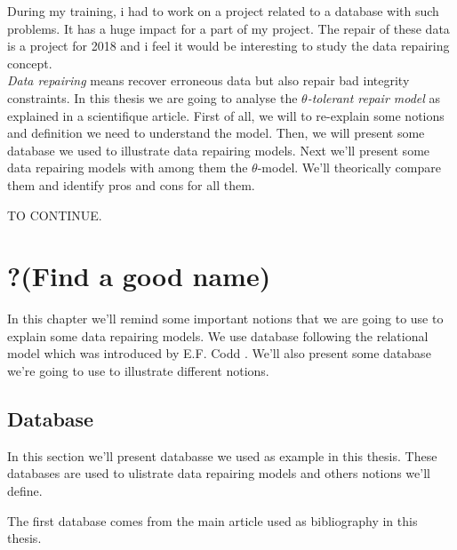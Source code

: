 \documentclass[letterpaper, 12pt]{report}
\newcommand{\alinea}{
\hspace*{0.5cm}}
\begin{document}
During my training, i had to work on a project related to a database with such problems. It has a huge impact for a part of my project. The repair of these data is a project for 2018 and i feel it would be interesting to study the data repairing concept.\\

\emph{Data repairing} means recover erroneous data but also repair bad integrity constraints. In this thesis we are going to analyse the \emph{$\theta$-tolerant repair model} as explained in a scientifique article\cite{main}. First of all, we will to re-explain some notions and definition we need to understand the model. Then, we will present some database we used to illustrate data repairing models. Next we'll present some data repairing models with among them the $\theta$-model. We'll theorically compare them and identify pros and cons for all them.

TO CONTINUE.

\chapter{?(Find a good name)}

In this chapter we'll remind some important notions that we are going to use to explain some data repairing models. We use database following the relational model which was introduced by E.F. Codd \cite{misc1}. We'll also present some database we're going to use to illustrate different notions.
\section{Database}

\alinea In this section we'll present databasse we used as example in this thesis. These databases are used to ulistrate data repairing models and others notions we'll  define.

The first database comes from the main article used as bibliography in this thesis\cite{main}.
\end{document}
